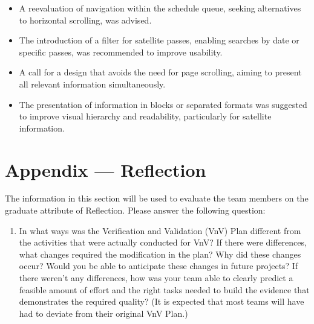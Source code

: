 \documentclass[12pt, titlepage]{article}
\begin{document}
\begin{itemize}
\begin{itemize}
\begin{itemize}
            \item A reevaluation of navigation within the schedule queue, seeking alternatives to horizontal scrolling, was advised.
            \item The introduction of a filter for satellite passes, enabling searches by date or specific passes, was recommended to improve usability.
            \item A call for a design that avoids the need for page scrolling, aiming to present all relevant information simultaneously.
            \item The presentation of information in blocks or separated formats was suggested to improve visual hierarchy and readability, particularly for satellite information.
        \end{itemize}
    \end{itemize}
\end{itemize}









\newpage{}
\section*{Appendix --- Reflection}

The information in this section will be used to evaluate the team members on the
graduate attribute of Reflection.  Please answer the following question:

\begin{enumerate}
  \item In what ways was the Verification and Validation (VnV) Plan different
  from the activities that were actually conducted for VnV?  If there were
  differences, what changes required the modification in the plan?  Why did
  these changes occur?  Would you be able to anticipate these changes in future
  projects?  If there weren't any differences, how was your team able to clearly
  predict a feasible amount of effort and the right tasks needed to build the
  evidence that demonstrates the required quality?  (It is expected that most
  teams will have had to deviate from their original VnV Plan.)
\end{enumerate}
\end{document}
